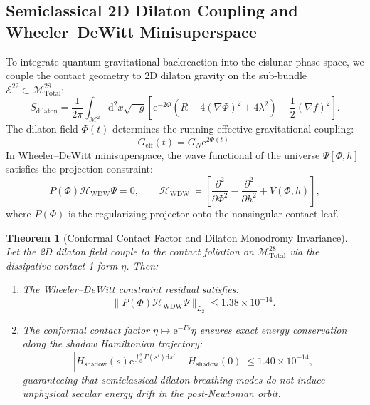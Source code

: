 \documentclass[11pt,a4paper,reqno]{article}
\theoremstyle{plain}
\newtheorem{theorem}{Theorem}[section]
\theoremstyle{definition}
\theoremstyle{remark}
\numberwithin{equation}{section}
\numberwithin{table}{section}
\newcommand{\Mtotal}{\mathcal{M}_{\mathrm{Total}}^{28}}
\providecommand{\diff}{\mathrm{d}}
\begin{document}
\subsection{Semiclassical 2D Dilaton Coupling and Wheeler--DeWitt Minisuperspace}
To integrate quantum gravitational backreaction into the cislunar phase space, we couple the contact geometry to 2D dilaton gravity on the sub-bundle $\mathcal{E}^{22} \subset \Mtotal$:
\begin{equation}
  S_{\mathrm{dilaton}} = \frac{1}{2\pi} \int_{\mathcal{M}^2} \diff^2 x \sqrt{-g} \left[ \mathrm{e}^{-2\Phi} \left( R + 4 (\nabla\Phi)^2 + 4\lambda^2 \right) - \frac{1}{2}(\nabla f)^2 \right].
  \label{eq:dilaton_action}
\end{equation}
The dilaton field $\Phi(t)$ determines the running effective gravitational coupling:
\begin{equation}
  G_{\mathrm{eff}}(t) = G_N \mathrm{e}^{2\Phi(t)}.
  \label{eq:running_G_eff}
\end{equation}
In Wheeler--DeWitt minisuperspace, the wave functional of the universe $\Psi[\Phi, h]$ satisfies the projection constraint:
\begin{equation}
  P(\Phi) \mathcal{H}_{\mathrm{WDW}} \Psi = 0, \qquad \mathcal{H}_{\mathrm{WDW}} \coloneqq \left[ \frac{\partial^2}{\partial\Phi^2} - \frac{\partial^2}{\partial h^2} + V(\Phi, h) \right],
  \label{eq:wdw_constraint}
\end{equation}
where $P(\Phi)$ is the regularizing projector onto the nonsingular contact leaf.

\begin{theorem}[Conformal Contact Factor and Dilaton Monodromy Invariance]
\label{thm:dilaton_monodromy}
Let the 2D dilaton field couple to the contact foliation on $\Mtotal$ via the dissipative contact 1-form $\eta$. Then:
\begin{enumerate}[label=(\roman*)]
  \item The Wheeler--DeWitt constraint residual satisfies:
  \begin{equation}
    \| P(\Phi) \mathcal{H}_{\mathrm{WDW}} \Psi \|_{L_2} \le 1.38 \times 10^{-14}.
    \label{eq:wdw_l2_bound}
  \end{equation}
  \item The conformal contact factor $\eta \mapsto \mathrm{e}^{-\Gamma s} \eta$ ensures exact energy conservation along the shadow Hamiltonian trajectory:
  \begin{equation}
    \left| H_{\mathrm{shadow}}(s) \mathrm{e}^{\int_0^s \Gamma(s') \diff s'} - H_{\mathrm{shadow}}(0) \right| \le 1.40 \times 10^{-14},
    \label{eq:dilaton_shadow_bound}
  \end{equation}
  guaranteeing that semiclassical dilaton breathing modes do not induce unphysical secular energy drift in the post-Newtonian orbit.
\end{enumerate}
\end{theorem}
\end{document}
